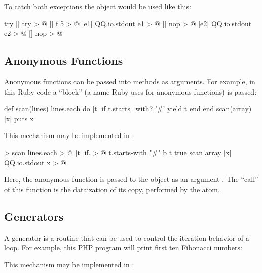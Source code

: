 \documentclass[sigplan,nonacm]{acmart}
\begin{document}
To catch both exceptions the object  would be used like this:

\begin{ffcode}
try
  []
    try > @
      []
        f 5 > @
      [e1]
        QQ.io.stdout e1 > @
      []
        nop > @
  [e2]
    QQ.io.stdout e2 > @
  []
    nop > @
\end{ffcode}

\subsection{Anonymous Functions}
\label{sec:blocks}

Anonymous functions can be passed into methods as arguments. For example, in this Ruby code a ``block'' (a name Ruby uses for anonymous functions) is passed:

\begin{ffcode}
def scan(lines)
  lines.each do |t|
    if t.starts_with? '#' yield t
  end
end
scan(array) { |x| puts x }
\end{ffcode}

This mechanism may be implemented in \eolang{}:

\begin{ffcode}
[lines b] > scan
  lines.each > @
    [t]
      if. > @
        t.starts-with "#"
        b t
        true
scan
  array
  [x]
    QQ.io.stdout x > @
\end{ffcode}

Here, the anonymous function is passed to the object  as an argument . The ``call'' of this function is the dataization of its copy, performed by the  atom.

\subsection{Generators}
\label{sec:generators}

A generator is a routine that can be used to control the iteration behavior of a loop.
For example, this PHP program will print first ten Fibonacci numbers:


This mechanism may be implemented in \eolang{}:
\end{document}
